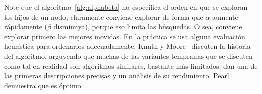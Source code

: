   Note que el algoritmo~\ref{alg:alphabeta}
  no especifica el orden en que se exploran los hijos de un nodo,
  claramente conviene explorar de forma que \(\alpha\) aumente rápidamente
  (\(\beta\) disminuya),
  porque eso limita las búsquedas.
  O sea,
  conviene explorar primero las mejores movidas.
  En la práctica se usa alguna evaluación heurística
  para ordenarlos adecuadamente.
  Knuth y Moore~%
    \cite{knuth75:_alpha_beta_pruning}
  discuten la historia del algoritmo,
  arguyendo que muchas de las variantes tempranas que se discuten como tal
  en realidad son algoritmos similares,
  bastante más limitados;
  dan una de las primeras descripciones precisas
  y un análisis de su rendimiento.
  Pearl~%
    \cite{pearl82:_branch_factor_alpha_beta}
  demuestra que es óptimo.




